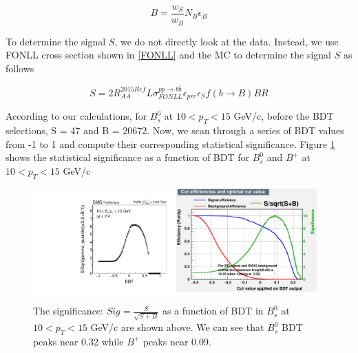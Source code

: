 \begin{equation}
B = \frac{w_{S}}{w_{B}} N_{B} \epsilon_{B}
\end{equation}

To determine the signal $S$, we do not directly look at the data. Instead, we use FONLL cross section \cite{FONLLRef} shown in \ref{FONLL} and the MC to determine the signal $S$ as follows

\begin{equation}
S = 2 R_{AA}^{2015Ref} L \sigma_{FONLL}^{pp\rightarrow b\bar b} \epsilon_{pre} \epsilon_{S} f(b\rightarrow B) BR
\end{equation}

According to our calculations, for $B^0_s$ at $10 < p_T < 15$ GeV/c, before the BDT selections, S = 47 and B = 20672. Now, we scan through a series of BDT values from -1 to 1 and compute their corresponding statistical significance. Figure \ref{WorkingPoint} shows the statistical significance as a function of BDT for $B^0_s$ and $B^+$ at $10 < p_T <  15$ GeV/c

\begin{figure}[h]
\begin{center}
\includegraphics[width= 0.48\textwidth]{Figures/Chapter4/BsSig_10_15.pdf}
\includegraphics[width= 0.48\textwidth]{Figures/Chapter4/BPSig_10_15.pdf}
\caption{The significance: $Sig = \frac{S}{\sqrt{S+B}}$ as a function of BDT in $B^0_s$ at $10 < p_T <  15$ GeV/c are shown above. We can see that $B^0_s$ BDT peaks near 0.32 while $B^+$ peaks near 0.09.}
\label{WorkingPoint}
\end{center}
\end{figure}

